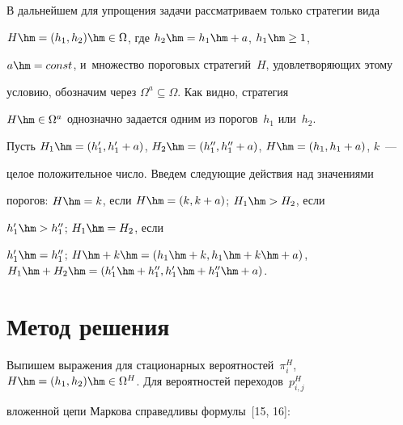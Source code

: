   


  В дальнейшем для упрощения задачи рассматриваем только стратегии вида 


$H\hm= (h_1,h_2)\hm\in \Omega$, где $h_2\hm= h_1\hm+a$, $h_1\hm\geq 1$, 


$a\hm=const$, и~множество пороговых стратегий~$H$, удовлетворяющих этому 


условию, обозначим через $\Omega^a\subseteq \Omega$. Как видно, стратегия 


$H\hm\in \Omega^a$ однозначно задается одним из порогов~$h_1$ или~$h_2$. 


Пусть $H_1\hm= (h^\prime_1,h_1^\prime+a)$, $H_2\hm= 


(h_1^{\prime\prime},h_1^{\prime\prime}+a)$, $H\hm= (h_1,h_1+a)$, $k$~--- 


целое положительное число. Введем следующие действия над значениями 


порогов: $H\hm=k$, если $H\hm= (k,k+a)$; $H_1\hm>H_2$, если 


$h_1^\prime\hm>h_1^{\prime\prime}$; $H_1\hm=H_2$, если 


$h_1^\prime\hm=h_1^{\prime\prime}$; $H\hm+k\hm= (h_1\hm+k, 


h_1\hm+k\hm+a)$, $H_1\hm+H_2\hm= (h_1^\prime \hm+ h_1^{\prime\prime}, 


h_1^\prime\hm+h_1^{\prime\prime}\hm+a)$. 


  


  \section{Метод решения}


  


  Выпишем выражения для стационарных вероятностей~$\pi_i^H$, $H\hm= 


(h_1,h_2)\hm\in \Omega^H$. Для вероятностей переходов~$p_{i,j}^H$ 


вложенной цепи Маркова справедливы формулы~[15, 16]:


